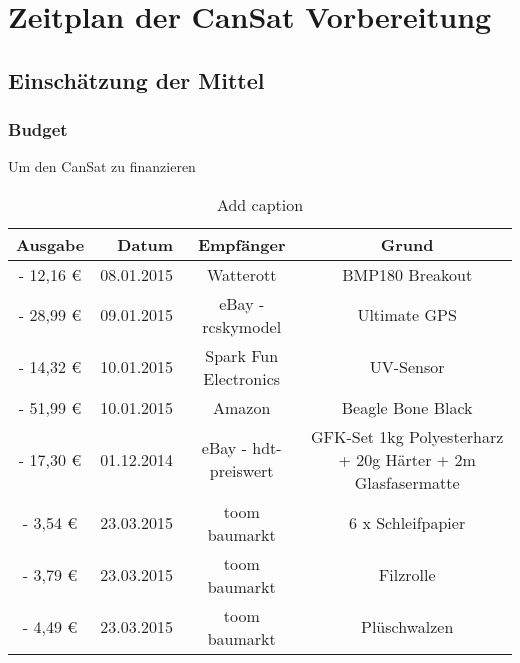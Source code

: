 \section{Zeitplan der CanSat Vorbereitung}

\subsection{Einschätzung der Mittel}
\subsubsection{Budget}
\label{subsubsec:Budget}

Um den CanSat zu finanzieren 
\begin{table}[htbp]
  \centering
  \caption{Add caption}
    \begin{tabular}{rrrr}
    \toprule
    \multicolumn{1}{c}{\textbf{Ausgabe}} & \textbf{Datum} & \multicolumn{1}{c}{\textbf{Empfänger}} & \multicolumn{1}{c}{\textbf{Grund}} \\
    \midrule
    \multicolumn{1}{c}{-         12,16 \euro } & 08.01.2015 & \multicolumn{1}{c}{Watterott} & \multicolumn{1}{c}{BMP180 Breakout} \\
    \multicolumn{1}{c}{-         28,99 \euro } & 09.01.2015 & \multicolumn{1}{c}{eBay - rcskymodel} & \multicolumn{1}{c}{Ultimate GPS} \\
    \multicolumn{1}{c}{-         14,32 \euro } & 10.01.2015 & \multicolumn{1}{c}{Spark Fun Electronics} & \multicolumn{1}{c}{UV-Sensor} \\
    \multicolumn{1}{c}{-         51,99 \euro } & 10.01.2015 & \multicolumn{1}{c}{Amazon} & \multicolumn{1}{c}{Beagle Bone Black} \\
    \multicolumn{1}{c}{-         17,30 \euro } & 01.12.2014 & \multicolumn{1}{c}{eBay - hdt-preiswert} & \multicolumn{1}{c}{
GFK-Set 1kg Polyesterharz + 20g Härter + 2m Glasfasermatte} \\
    \multicolumn{1}{c}{-           3,54 \euro } & 23.03.2015 & \multicolumn{1}{c}{toom baumarkt} & \multicolumn{1}{c}{6 x Schleifpapier} \\
    \multicolumn{1}{c}{-           3,79 \euro } & 23.03.2015 & \multicolumn{1}{c}{toom baumarkt} & \multicolumn{1}{c}{Filzrolle} \\
    \multicolumn{1}{c}{-           4,49 \euro } & 23.03.2015 & \multicolumn{1}{c}{toom baumarkt} & \multicolumn{1}{c}{Plüschwalzen} \\

\end{tabular}
\end{table}
